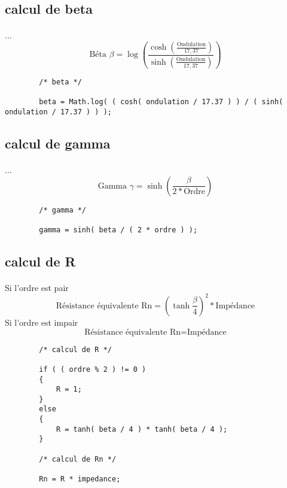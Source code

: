 \documentclass[a4paper,11pt]{article}
\begin{document}
\subsection{calcul de beta}
    \paragraph{}
    ...\[ \mbox{Béta } \beta = \log( \frac{ \cosh( \frac{ \mbox{Ondulation} }{17,37} ) } { \sinh( \frac{ \mbox{Ondulation} }{17,37} ) } )\]
    \begin{lstlisting}
        /* beta */

        beta = Math.log( ( cosh( ondulation / 17.37 ) ) / ( sinh( ondulation / 17.37 ) ) );

    \end{lstlisting}

\subsection{calcul de gamma}
    \paragraph{}
    ...\[ \mbox{Gamma } \gamma = \sinh( \frac{ \beta }{ 2 * \mbox{Ordre} } ) \]
    \begin{lstlisting}
        /* gamma */

        gamma = sinh( beta / ( 2 * ordre ) );

    \end{lstlisting}

\subsection{calcul de R}
    \paragraph{}
    Si l'ordre est pair \[ \mbox{Résistance équivalente Rn} = ( \tanh{ \frac{ \beta }{ 4 } } ) ^2 * \mbox{Impédance} \]
    Si l'ordre est impair \[ \mbox{Résistance équivalente Rn} = \mbox{Impédance} \]
    \begin{lstlisting}
        /* calcul de R */

        if ( ( ordre % 2 ) != 0 )
        {
            R = 1;
        }
        else
        {
            R = tanh( beta / 4 ) * tanh( beta / 4 );
        }

        /* calcul de Rn */

        Rn = R * impedance;

    \end{lstlisting}
\end{document}
